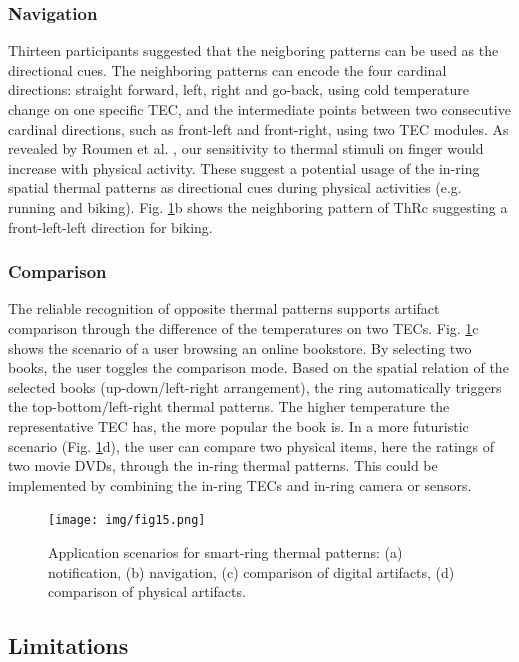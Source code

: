 \documentclass[preprint,12pt]{elsarticle}
\begin{document}
\subsubsection{Navigation}
Thirteen participants suggested that the neigboring patterns can be used as the directional cues. The neighboring patterns can encode the four cardinal directions: straight forward, left, right and go-back, using cold temperature change on one specific TEC, and the intermediate points between two consecutive cardinal directions, such as front-left and front-right, using two TEC modules. As revealed by Roumen et al. \cite{24}, our sensitivity to thermal stimuli on finger would increase with physical activity. These suggest a potential usage of the in-ring spatial thermal patterns as directional cues during physical activities (e.g. running and biking). Fig. \ref{fig:15}b shows the neighboring pattern of ThRc suggesting a front-left-left direction for biking.

\subsubsection{Comparison}
The reliable recognition of opposite thermal patterns supports artifact comparison through the difference of the temperatures on two TECs. Fig. \ref{fig:15}c shows the scenario of a user browsing an online bookstore. By selecting two books, the user toggles the comparison mode. Based on the spatial relation of the selected books (up-down/left-right arrangement), the ring automatically triggers the top-bottom/left-right thermal patterns. The higher temperature the representative TEC has, the more popular the book is. In a more futuristic scenario (Fig. \ref{fig:15}d), the user can compare two physical items, here the ratings of two movie DVDs, through the in-ring thermal patterns. This could be implemented by combining the in-ring TECs and in-ring camera or sensors.

\begin{figure}[tp]
  \centering
  \texttt{[image: img/fig15.png]}
  \caption{Application scenarios for smart-ring thermal patterns: (a) notification, (b) navigation, (c) comparison of digital artifacts, (d) comparison of physical artifacts.}
  \label{fig:15}
\end{figure}

\subsection{Limitations}
\end{document}

